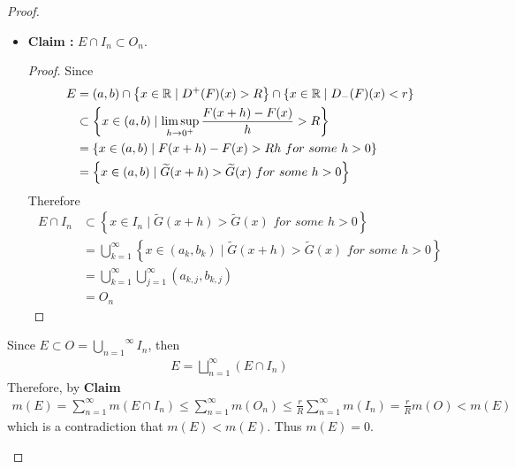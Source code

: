 \begin{thm}
\begin{proof}
\begin{enumerate}
				\begin{itemize}
					\item \textbf{Claim :} $E \cap I_n \subset O_n$.
					\begin{proof}
						Since
						\begin{align}
							E 
							&= (a , b) \cap \left\{ x \in \mathbb{R} \mid D^{+}(F)(x) > R \right\} \cap \left\{ x \in \mathbb{R} \mid D_{-}(F)(x) < r \right\} \\
							&\subset \left\{ x \in (a , b) \mid \limsup_{h \to 0^{+}}{\frac{F(x + h) - F(x)}{h}} > R \right\} \\
							&= \left\{ x \in (a , b) \mid F(x + h) - F(x) > Rh \,\, for \,\, some \,\, h > 0 \right\} \\
							&= \left\{ x \in (a , b) \mid \widetilde{G}(x + h) > \widetilde{G}(x) \,\, for \,\, some \,\, h > 0 \right\}
						\end{align}
						Therefore
						\begin{align}
							E \cap I_n
							&\subset \left\{ x \in I_n \mid \widetilde{G}(x + h) > \widetilde{G}(x) \,\, for \,\, some \,\, h > 0 \right\} \\
							&= \bigcup_{k = 1}^{\infty}{\left\{ x \in (a_k , b_k) \mid \widetilde{G}(x + h) > \widetilde{G}(x) \,\, for \,\, some \,\, h > 0 \right\}} \\
							&= \bigcup_{k = 1}^{\infty} \bigcup_{j = 1}^{\infty}{(a_{k , j} , b_{k , j})} \\
							&= O_n
						\end{align}
					\end{proof}
				\end{itemize}
				
				\vspace{1em}
				
				Since $E \subset O = \overset{\infty}{\underset{n = 1}{\bigcup}}{I_n}$, then
				\begin{align}
					E = \bigsqcup_{n = 1}^{\infty}{(E \cap I_n)}
				\end{align}
				Therefore, by \textbf{Claim}
				\begin{align}
					m(E) 
					= \sum_{n = 1}^{\infty}{m(E \cap I_n)}
					\leq \sum_{n = 1}^{\infty}{m(O_n)}
					\leq \frac{r}{R} \sum_{n = 1}^{\infty}{m(I_n)}
					= \frac{r}{R} m(O)
					< m(E)
				\end{align}
				which is a contradiction that $m(E) < m(E)$. Thus $m(E) = 0$.
			\end{enumerate}
		\end{proof}
	\end{thm}

